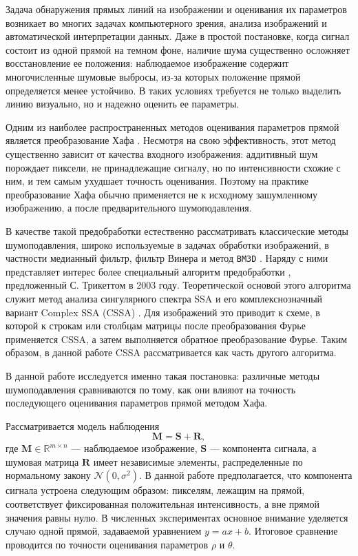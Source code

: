 
Задача обнаружения прямых линий на изображении и оценивания их параметров возникает во многих задачах компьютерного зрения, анализа изображений и автоматической интерпретации данных. Даже в простой постановке, когда сигнал состоит из одной прямой на темном фоне, наличие шума существенно осложняет восстановление ее положения: наблюдаемое изображение содержит многочисленные шумовые выбросы, из-за которых положение прямой определяется менее устойчиво. В таких условиях требуется не только выделить линию визуально, но и надежно оценить ее параметры.

Одним из наиболее распространенных методов оценивания параметров прямой является преобразование Хафа \cite{duda1972hough}. Несмотря на свою эффективность, этот метод существенно зависит от качества входного изображения: аддитивный шум порождает пиксели, не принадлежащие сигналу, но по интенсивности схожие с ним, и тем самым ухудшает точность оценивания. Поэтому на практике преобразование Хафа обычно применяется не к исходному зашумленному изображению, а после предварительного шумоподавления.

В качестве такой предобработки естественно рассматривать классические методы шумоподавления, широко используемые в задачах обработки изображений, в частности медианный фильтр, фильтр Винера и метод \texttt{BM3D} \cite{huang1979,wiener1949,lim1990,dabov2007}. Наряду с ними представляет интерес более специальный алгоритм предобработки \cite{trickett2003}, предложенный С. Трикеттом в 2003 году. Теоретической основой этого алгоритма служит метод анализа сингулярного спектра SSA и его комплекснозначный вариант Complex SSA (CSSA) \cite{ts_structure,ssa_with_r,zhornikova2016}. Для изображений это приводит к схеме, в которой к строкам или столбцам матрицы после преобразования Фурье применяется CSSA, а затем выполняется обратное преобразование Фурье. Таким образом, в данной работе CSSA рассматривается как часть другого алгоритма.

В данной работе исследуется именно такая постановка: различные методы шумоподавления сравниваются по тому, как они влияют на точность последующего оценивания параметров прямой методом Хафа.

Рассматривается модель наблюдения
\[
\mathbf{M} = \mathbf{S} + \mathbf{R},
\]
где $\mathbf{M} \in \mathbb{R}^{m \times n}$ --- наблюдаемое изображение, $\mathbf{S}$ --- компонента сигнала, а шумовая матрица $\mathbf{R}$ имеет независимые элементы, распределенные по нормальному закону $\mathcal{N}(0,\sigma^2)$. В данной работе предполагается, что компонента сигнала устроена следующим образом: пикселям, лежащим на прямой, соответствует фиксированная положительная интенсивность, а вне прямой значения равны нулю. В численных экспериментах основное внимание уделяется случаю одной прямой, задаваемой уравнением $y = ax + b$. Итоговое сравнение проводится по точности оценивания параметров $\rho$ и $\theta$.

